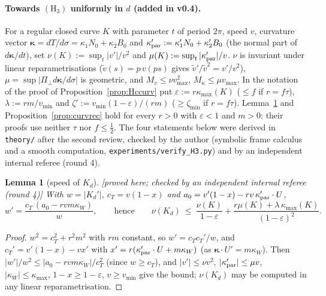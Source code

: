 \documentclass[10pt,a4paper]{article}
\theoremstyle{plain}
\newtheorem{lemma}[theorem]{Lemma}
\theoremstyle{definition}
\theoremstyle{remark}
\newcommand{\status}[1]{\textsf{\small [#1]}}
\begin{document}
\paragraph{Towards $(\mathrm H_3)$ uniformly in $d$ (added in v0.4).} For a regular closed curve $K$ with parameter $t$ of period $2\pi$, speed $v$, curvature vector $\boldsymbol\kappa=dT/d\sigma=\kappa_1N_0+\kappa_2B_0$ and $\kappa_{\rm par}':=\kappa_1'N_0+\kappa_2'B_0$ (the normal part of $d\boldsymbol\kappa/dt$), set $\nu(K):=\sup_t|v'|/v^2$ and $\mu(K):=\sup_t|\kappa_{\rm par}'|/v$. $\nu$ is invariant under linear reparametrisations ($\tilde v(s)=p\,v(ps)$ gives $\tilde v'/\tilde v^2=v'/v^2$), $\mu=\sup|\Pi_\perp d\boldsymbol\kappa/d\sigma|$ is geometric, and $M_v\le\nu v_{\max}^2$, $M_\kappa\le\mu v_{\max}$. In the notation of the proof of Proposition~\ref{prop:Hccurv} put $\varepsilon:=r\kappa_{\max}(K)$ ($\le f$ if $r=f\tau$), $\lambda:=rm/v_{\min}$ and $\zeta':=v_{\min}(1-\varepsilon)/(rm)$ ($\ge\zeta_{\min}$ if $r=f\tau$). Lemma~\ref{lem:speedrec} and Proposition~\ref{prop:curvrec} hold for every $r>0$ with $\varepsilon<1$ and $m>0$: their proofs use neither $\tau$ nor $f\le\frac12$. The four statements below were derived in \texttt{theory/} after the second review, checked by the author (symbolic frame calculus and a smooth computation, \texttt{experiments/verify\_H3.py}) and by an independent internal referee (round 4).

\begin{lemma}[speed of $K_d$]\label{lem:speedrec}\status{proved here; checked by an independent internal referee (round 4)}
With $w=|K_d'|$, $c_T=v(1-x)$ and $a_0=v'(1-x)-rv\,\kappa_{\rm par}'\cdot U$,
\begin{equation}\label{eq:wprime}
w'=\frac{c_T\,(a_0-rvm\kappa_W)}{w},
\qquad\text{hence}\qquad
\nu(K_d)\ \le\ \frac{\nu(K)}{1-\varepsilon}+\frac{r\mu(K)+\lambda\,\kappa_{\max}(K)}{(1-\varepsilon)^2}.
\end{equation}
\end{lemma}
\begin{proof}
$w^2=c_T^2+r^2m^2$ with $rm$ constant, so $w'=c_Tc_T'/w$, and $c_T'=v'(1-x)-vx'$ with $x'=r(\kappa_{\rm par}'\cdot U+m\kappa_W)$ (as $\boldsymbol\kappa\cdot U'=m\kappa_W$). Then $|w'|/w^2\le|a_0-rvm\kappa_W|/c_T^2$ (since $w\ge c_T$), and $|v'|\le\nu v^2$, $|\kappa_{\rm par}'|\le\mu v$, $|\kappa_W|\le\kappa_{\max}$, $1-x\ge1-\varepsilon$, $v\ge v_{\min}$ give the bound; $\nu(K_d)$ may be computed in any linear reparametrisation.
\end{proof}
\end{document}
